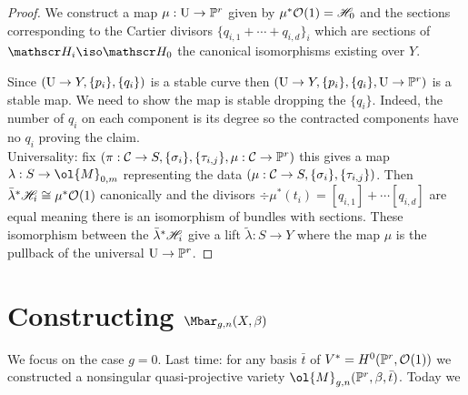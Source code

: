 \documentclass[12pt]{article}
\begin{document}
\begin{proof}
We construct a map $\mu : \mathrm{U} \to \mathbb{P}^r$ given by $\mu^* \mathcal{O}_{}(1) = \mathscr{H}_0$ and the sections corresponding to the Cartier divisors $\{ q_{i,1} + \cdots + q_{i,d} \}_{i}$ which are sections of $\H_i \iso \H_0$ the canonical isomorphisms existing over $Y$. 

Since $(\mathrm{U} \to Y, \{ p_i \}, \{ q_i \})$ is a stable curve then $(\mathrm{U} \to Y, \{ p_i \}, \{ q_i \}, \mathrm{U} \to \mathbb{P}^r)$ is a stable map. We need to show the map is stable dropping the $\{ q_i \}$. Indeed, the number of $q_i$ on each component is its degree so the contracted components have no $q_i$ proving the claim. 
\bigskip\\
Universality: fix $(\pi : \mathcal{C} \to S, \{ \sigma_i \}, \{ \tau_{i,j} \}, \mu : \mathcal{C} \to \mathbb{P}^r)$ this gives a map $\lambda : S \to \ol{M}_{0,m}$ representing the data $(\mu : \mathcal{C} \to S, \{ \sigma_i \}, \{ \tau_{i,j} \})$. Then $\bar{\lambda}^* \mathscr{H}_i \cong \mu^* \mathcal{O}_{}(1)$ canonically and the divisors $\div \mu^* (t_i) = [q_{i,1}] + \cdots [q_{i,d}]$ are equal meaning there is an isomorphism of bundles with sections. These isomorphism between the $\bar{\lambda}^* \mathscr{H}_i$ give a lift $\tilde{\lambda} : S \to Y$ where the map $\mu$ is the pullback of the universal $\mathrm{U} \to \mathbb{P}^r$. 
\end{proof}

\section{Constructing $\Mbar_{g,n}(X, \beta)$}

We focus on the case $g = 0$. Last time: for any basis $\bar{t}$ of $V^* = H^0(\P^r, \struct{}(1))$ we constructed a nonsingular quasi-projective variety $\ol{M}_{g,n}(\P^r, \beta, \bar{t})$. Today we
\begin{enumerate}
\item construct $\ol{M}_{g,h}(\P^r, \beta)$ via patching the rigid guys
\item construct $\ol{M}_[g,n}(X, \beta)$ as a closed subscheme. 
\end{enumerate}
\end{document}
